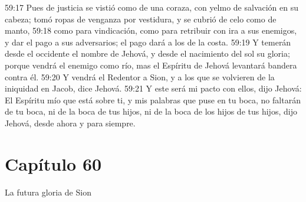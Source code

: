 59:17 Pues de justicia se vistió como de una coraza, con yelmo de salvación en su cabeza; tomó ropas de venganza por vestidura, y se cubrió de celo como de manto, 
59:18 como para vindicación, como para retribuir con ira a sus enemigos, y dar el pago a sus adversarios; el pago dará a los de la costa. 
59:19 Y temerán desde el occidente el nombre de Jehová, y desde el nacimiento del sol su gloria; porque vendrá el enemigo como río, mas el Espíritu de Jehová levantará bandera contra él. 
59:20 Y vendrá el Redentor a Sion, y a los que se volvieren de la iniquidad en Jacob, dice Jehová. 
59:21 Y este será mi pacto con ellos, dijo Jehová: El Espíritu mío que está sobre ti, y mis palabras que puse en tu boca, no faltarán de tu boca, ni de la boca de tus hijos, ni de la boca de los hijos de tus hijos, dijo Jehová, desde ahora y para siempre. 
\section*{Capítulo 60 }
La futura gloria de Sion 
 
